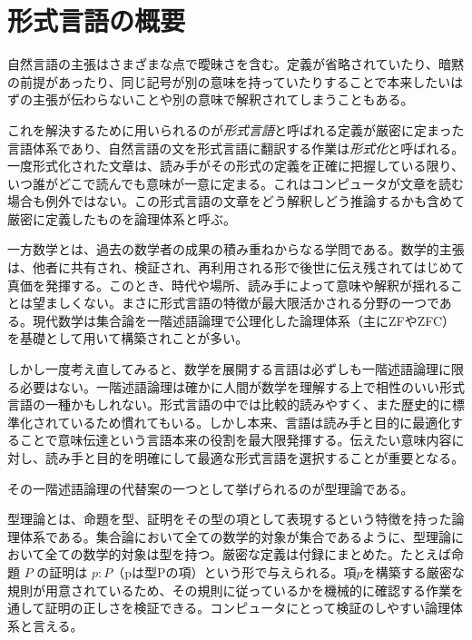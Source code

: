 \documentclass[a4paper,12pt]{bxjsbook}
\newlength{\customindent}
\newenvironment{body}{
  \par
  \begingroup
  \setlength{\leftskip}{\customindent}
  \setlength{\rightskip}{0pt}
  \setlength{\parindent}{1em}
  \setlength{\displayindent}{\customindent}
  \setlength{\displaywidth}{\dimexpr\linewidth-\customindent\relax}
}{
  \par
  \endgroup
}
\theoremstyle{theorem}
\begin{document}
    \section{形式言語の概要}
    \begin{body}
      \indent 自然言語の主張はさまざまな点で曖昧さを含む。定義が省略されていたり、暗黙の前提があったり、同じ記号が別の意味を持っていたりすることで本来したいはずの主張が伝わらないことや別の意味で解釈されてしまうこともある。

      \indent これを解決するために用いられるのが\emph{形式言語}と呼ばれる定義が厳密に定まった言語体系であり、自然言語の文を形式言語に翻訳する作業は\emph{形式化}と呼ばれる。一度形式化された文章は、読み手がその形式の定義を正確に把握している限り、いつ誰がどこで読んでも意味が一意に定まる。これはコンピュータが文章を読む場合も例外ではない。この形式言語の文章をどう解釈しどう推論するかも含めて厳密に定義したものを論理体系と呼ぶ。

      \indent 一方数学とは、過去の数学者の成果の積み重ねからなる学問である。数学的主張は、他者に共有され、検証され、再利用される形で後世に伝え残されてはじめて真価を発揮する。このとき、時代や場所、読み手によって意味や解釈が揺れることは望ましくない。まさに形式言語の特徴が最大限活かされる分野の一つである。現代数学は集合論を一階述語論理で公理化した論理体系（主にZFやZFC）を基礎として用いて構築されことが多い。

      \indent しかし一度考え直してみると、数学を展開する言語は必ずしも一階述語論理に限る必要はない。一階述語論理は確かに人間が数学を理解する上で相性のいい形式言語の一種かもしれない。形式言語の中では比較的読みやすく、また歴史的に標準化されているため慣れてもいる。しかし本来、言語は読み手と目的に最適化することで意味伝達という言語本来の役割を最大限発揮する。伝えたい意味内容に対し、読み手と目的を明確にして最適な形式言語を選択することが重要となる。

      \indent その一階述語論理の代替案の一つとして挙げられるのが型理論である。
      
      \indent 型理論とは、命題を型、証明をその型の項として表現するという特徴を持った論理体系である。集合論において全ての数学的対象が集合であるように、型理論において全ての数学的対象は型を持つ。厳密な定義は付録にまとめた。たとえば命題 $P$ の証明は $p:P$（pは型Pの項）という形で与えられる。項$p$を構築する厳密な規則が用意されているため、その規則に従っているかを機械的に確認する作業を通して証明の正しさを検証できる。コンピュータにとって検証のしやすい論理体系と言える。

    \end{body}
\end{document}
